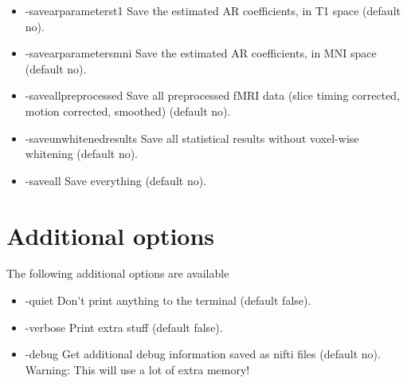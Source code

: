 \begin{itemize}
\item -savearparameterst1        
\newline \newline Save the estimated AR coefficients, in T1 space (default no). 

\item -savearparametersmni       
\newline \newline Save the estimated AR coefficients, in MNI space (default no). 

\item -saveallpreprocessed       
\newline \newline Save all preprocessed fMRI data  \newline (slice timing corrected, motion corrected, smoothed) (default no). 

\item -saveunwhitenedresults     
\newline \newline Save all statistical results without voxel-wise whitening (default no). 

\item -saveall                   
\newline \newline Save everything (default no). 


\end{itemize}

\section{Additional options}

The following additional options are available

\begin{itemize}

\item -quiet
\newline \newline Don't print anything to the terminal (default false). 

\item -verbose
\newline \newline Print extra stuff (default false).

\item -debug
\newline \newline Get additional debug information saved as nifti files (default no). Warning: This will use a lot of extra memory! 

\end{itemize}

